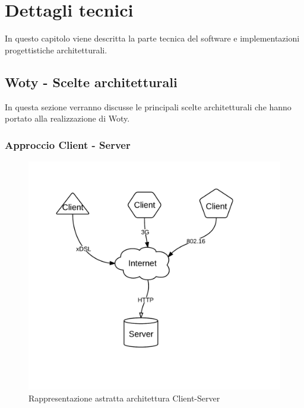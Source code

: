 


\chapter{Dettagli tecnici}


In questo capitolo viene descritta la parte tecnica del software e implementazioni progettistiche architetturali. 

\section{Woty - Scelte architetturali}
In questa sezione verranno discusse le principali scelte architetturali che hanno portato alla realizzazione di Woty. 

\subsection{Approccio Client - Server}

\begin{center}
\begin{figure}[ht]
\centering
\includegraphics[scale=0.55]{images/cap2/Client-server.png}
\caption{Rappresentazione astratta architettura Client-Server}
\end{figure}
\end{center}

